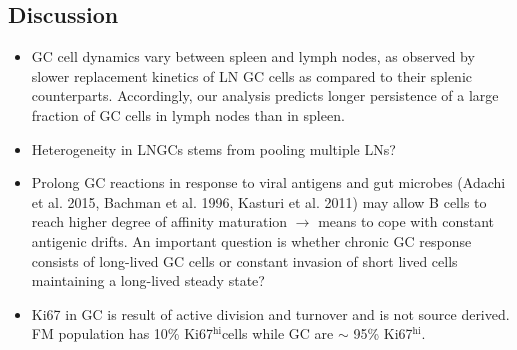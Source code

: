 \documentclass[11pt]{article}
\newcommand{\khi}{Ki67$^\text{hi}$}
\begin{document}
	\subsection*{Discussion}
	\begin{itemize}
		\item GC cell dynamics vary between spleen and lymph nodes, as observed by slower replacement kinetics of LN GC cells  as compared to their splenic counterparts.
		Accordingly, our analysis predicts longer persistence of a large fraction of GC cells in lymph nodes than in spleen.
		
		\item Heterogeneity in LNGCs stems from pooling multiple LNs?
		
		\item Prolong GC reactions in response to viral antigens and gut microbes (Adachi et al. 2015, Bachman et al. 1996, Kasturi et al. 2011) may allow B cells to reach higher degree of affinity maturation $\rightarrow$ means to cope with constant antigenic drifts. 
		An important question is whether chronic GC response consists of long-lived GC cells or constant invasion of short lived cells maintaining a long-lived steady state?
		
		\item Ki67 in GC is result of active division and turnover and is not source derived. FM population has 10\% \khi cells while GC are $\sim$ 95\% \khi. 
	\end{itemize}
	

	
\end{document}
